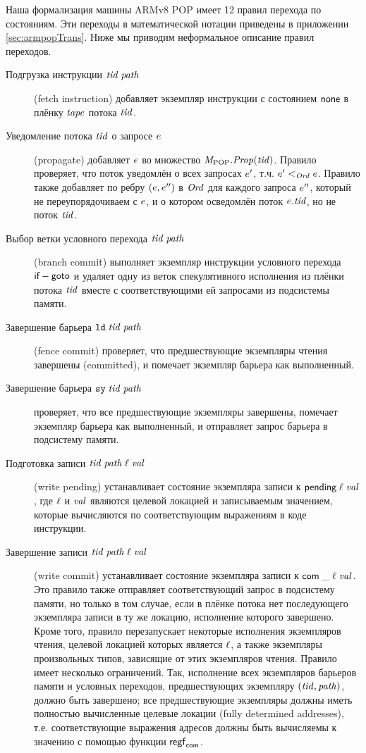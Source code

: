 Наша формализация машины ARMv8 POP имеет 12 правил перехода по состояниям.
Эти переходы в математической нотации приведены в приложении \ref{sec:armpopTrans}.
Ниже мы приводим неформальное описание правил переходов.
\begin{description}
\item[Подгрузка инструкции $\mathit{tid} \; \mathit{path}$] (fetch instruction)
  добавляет экземпляр инструкции с состоянием $\mathsf{none}$
  в плёнку $\mathit{tape}$ потока  $\mathit{tid}$.

\item[Уведомление потока $\mathit{tid}$ о запросе $e$] (propagate)
  добавляет $e$ во множество $\mathit{M}_{\mathrm{POP}}.\mathit{Prop}(\mathit{tid})$.
  Правило проверяет, что поток уведомлён о всех запросах $e'$, т.ч. $e' <_{\mathit{Ord}} e$.
  Правило также добавляет по ребру $(e, e'')$ в $\mathit{Ord}$ для каждого запроса $e''$,
  который не переупорядочиваем с $e$, и о котором осведомлён поток $e.\mathit{tid}$,
  но не поток $\mathit{tid}$.

\item[Выбор ветки условного перехода $\mathit{tid} \; \mathit{path}$] (branch commit)
  выполняет экземпляр инструкции условного перехода $\textsf{if}-\textsf{goto}$ и
  удаляет одну из веток спекулятивного исполнения из плёнки потока $\mathit{tid}$ вместе
  с соответствующими ей запросами из подсистемы памяти.

\item[Завершение барьера $\mathtt{ld} \; \mathit{tid} \; \mathit{path}$] (fence commit)
  проверяет, что предшествующие экземпляры чтения завершены (committed),
  и помечает экземпляр барьера как выполненный.
\item[Завершение барьера $\mathtt{sy} \; \mathit{tid} \; \mathit{path}$]
  проверяет, что все предшествующие экземпляры завершены,
  помечает экземпляр барьера как выполненный, и отправляет запрос барьера
  в подсистему памяти.
  
\item[Подготовка записи $\mathit{tid} \; \mathit{path} \; \ell \; \mathit{val}$] (write pending)
  устанавливает состояние экземпляра записи к $\textsf{pending} \; \ell \; \mathit{val}$,
  где $\ell$ и $\mathit{val}$ являются целевой локацией и записываемым значением,
  которые вычисляются по соответствующим выражениям в коде инструкции.

\item[Завершение записи $\mathit{tid} \; \mathit{path} \; \ell \; \mathit{val}$] (write commit)
  устанавливает состояние экземпляра записи к $\mathsf{com} \; \_ \; \ell \; \mathit{val}$.
  Это правило также отправляет соответствующий запрос в подсистему памяти,
  но только в том случае, если в плёнке потока нет последующего экземпляра записи
  в ту же локацию, исполнение которого завершено.
  Кроме того, правило перезапускает некоторые исполнения экземпляров чтения, целевой
  локацией которых является $\ell$, а также экземпляры произвольных типов, зависящие
  от этих экземпляров чтения.
  Правило имеет несколько ограничений.
  Так, исполнение всех экземпляров барьеров памяти и условных
  переходов, предшествующих экземпляру $(\mathit{tid}, \mathit{path})$, должно быть завершено;
  все предшествующие экземпляры должны иметь полностью вычисленные целевые
  локации (fully determined addresses), т.е. соответствующие выражения адресов
  должны быть вычисляемы к значению с помощью функции $\mathsf{regf}_\mathsf{com}$.


\end{description}
